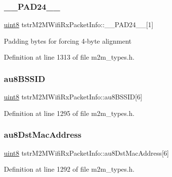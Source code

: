\subsubsection{\texorpdfstring{\+\_\+\+\_\+\+P\+A\+D24\+\_\+\+\_\+}{\_\_PAD24\_\_}}
{\footnotesize\ttfamily \hyperlink{group__DataT_ga4df709a77647e870bbf1d955b8edc9a6}{uint8} tstr\+M2\+M\+Wifi\+Rx\+Packet\+Info\+::\+\_\+\+\_\+\+P\+A\+D24\+\_\+\+\_\+\mbox{[}1\mbox{]}}

Padding bytes for forcing 4-\/byte alignment 

Definition at line 1313 of file m2m\+\_\+types.\+h.

\mbox{\label{structtstrM2MWifiRxPacketInfo_a1cd96b319db2d997d96c11e427d120aa}} 
\subsubsection{\texorpdfstring{au8\+B\+S\+S\+ID}{au8BSSID}}
{\footnotesize\ttfamily \hyperlink{group__DataT_ga4df709a77647e870bbf1d955b8edc9a6}{uint8} tstr\+M2\+M\+Wifi\+Rx\+Packet\+Info\+::au8\+B\+S\+S\+ID\mbox{[}6\mbox{]}}



Definition at line 1295 of file m2m\+\_\+types.\+h.

\mbox{\label{structtstrM2MWifiRxPacketInfo_a1ff13b2f28466795da06553e962c5226}} 
\subsubsection{\texorpdfstring{au8\+Dst\+Mac\+Address}{au8DstMacAddress}}
{\footnotesize\ttfamily \hyperlink{group__DataT_ga4df709a77647e870bbf1d955b8edc9a6}{uint8} tstr\+M2\+M\+Wifi\+Rx\+Packet\+Info\+::au8\+Dst\+Mac\+Address\mbox{[}6\mbox{]}}



Definition at line 1292 of file m2m\+\_\+types.\+h.

